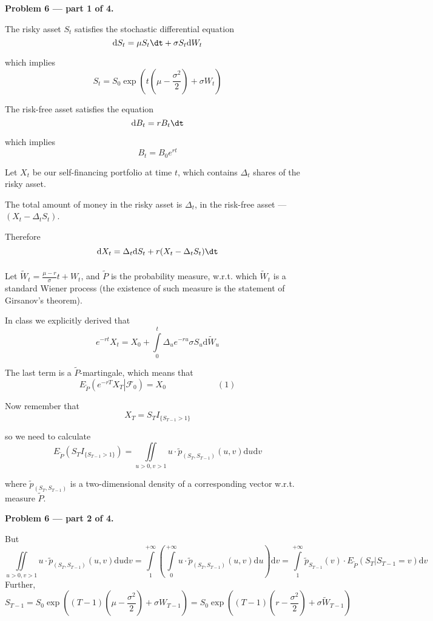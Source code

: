 \documentclass[12pt, a4paper]{article}
\renewcommand{\FF}{\mathcal{F}}
\newcommand{\ds}{\displaystyle}
\newcommand{\du}{\mathrm{d}u}
\newcommand{\dv}{\mathrm{d}v}
\begin{document}
\textbf{Problem 6 — part 1 of 4.}\par
The risky asset $S_{t}$ satisfies the stochastic differential equation $$\mathrm{d}S_{t} = \mu S_{t}\dt + \sigma S_{t}\mathrm{d}W_{t}$$\par which implies
$$
S_{t} = S_{0}\exp \left(t\left(\mu - \frac{\ds \sigma^{2}}{\ds 2}\right) + \sigma W_{t}\right)
$$\par
The risk-free asset satisfies the equation
$$
\mathrm{d}B_{t} = rB_{t}\dt
$$\par
which implies
$$
B_{t} = B_{0}e^{rt}
$$\par
Let $X_{t}$ be our self-financing portfolio at time $t$, which contains $\Delta_{t}$ shares of the risky asset.\par
The total amount of money in the risky asset is $\Delta_{t}$, in the risk-free asset — $(X_{t} - \Delta_{t}S_{t})$.\par
Therefore
$$
\mathrm{d}X_{t} = \Delta_{t}\mathrm{d}S_{t} + r(X_{t} - \Delta_{t}S_{t})\dt
$$\[\]\par
Let $\tilde{W}_{t} = \frac{\ds \mu - r}{\ds \sigma}t + W_{t}$, and $\tilde{P}$ is the probability measure, w.r.t. which $\tilde{W}_{t}$ is a standard Wiener process (the existence of such measure is the statement of Girsanov's theorem).\par
In class we explicitly derived that
$$
e^{-rt}X_{t} = X_{0} + \int\limits_{0}^{t}\Delta_{u}e^{-ru}\sigma S_{u}\mathrm{d}\tilde{W}_{u}
$$\par
The last term is a $\tilde{P}$-martingale, which means that
$$
E_{\tilde{P}}\left(\left.e^{-rT}X_{T}\right|\FF_{0}\right) = X_{0} \qquad\qquad\qquad (1)
$$\par
Now remember that
$$
X_{T} = S_{T}I_{\{S_{T-1} > 1\}}
$$\par
so we need to calculate
$$
E_{\tilde{P}}(S_{T}I_{\{S_{T-1} > 1\}}) = \iint\limits_{u > 0, v > 1}u\cdot \tilde{p}_{(S_{T}, S_{T-1})}(u,v)\du\dv
$$\par
where $\tilde{p}_{(S_{T}, S_{T-1})}$ is a two-dimensional density of a corresponding vector w.r.t. measure $\tilde{P}$.






\textbf{Problem 6 — part 2 of 4.}\par
But
\[
\iint\limits_{u > 0, v > 1}u\cdot \tilde{p}_{(S_{T}, S_{T-1})}(u,v)\du\dv = \int\limits_{1}^{+\infty}\left(\int\limits_{0}^{+\infty}u\cdot \tilde{p}_{(S_{T}, S_{T-1})}(u,v) \du\right)\dv = \int\limits_{1}^{+\infty}\tilde{p}_{S_{T-1}}(v)\cdot E_{\tilde{P}}\left(S_{T} | S_{T-1} = v\right)\dv
\]
Further,
\[
S_{T-1} = S_{0}\exp \left((T-1)\left(\mu - \frac{\ds \sigma^{2}}{\ds 2}\right) + \sigma W_{T-1}\right) = S_{0}\exp \left((T-1)\left(r - \frac{\ds \sigma^{2}}{\ds 2}\right) + \sigma \tilde{W}_{T-1}\right)
\]
\end{document}

